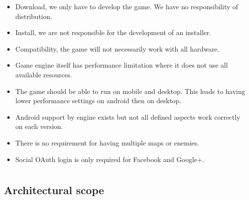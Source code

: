 \documentclass[letterpaper]{article}
\begin{document}
		\begin{itemize}
  		\item Download, we only have to develop the game. We have no responsibility of distribution.
  		\item Install, we are not responsible for the development of an installer.
  		\item Compatibility, the game will not necessarily work with all hardware.
  		\item Game engine itself has performance limitation where it does not use all available resources.
  		\item The game should be able to run on mobile and desktop. This leads to having lower performance settings on android then on desktop.
  		\item Android support by engine exists but not all defined aspects work correctly on each version.
  		\item There is no requirement for having multiple maps or enemies.
  		\item Social OAuth login is only required for Facebook and Google+.
		\end{itemize}
		
		\section*{\colorbox{black}{}} 
		\vspace{0.1in}
			
			\subsection*{ Architectural scope }
			\vspace{0.1in}	
			
\end{document}

